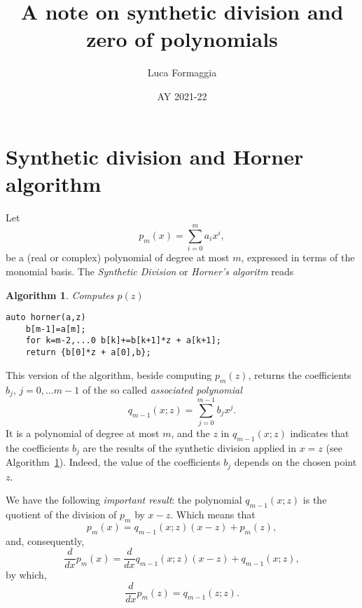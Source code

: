 \documentclass[10pt,a4paper]{article}
\author{Luca Formaggia}
\date{AY 2021-22}
\title{A note on synthetic division and zero of polynomials}
\theoremstyle{definition}%
\newtheorem{algo}{Algorithm}
\begin{document}
 
 \maketitle
 \section{Synthetic division and Horner algorithm}
 Let
 \[
 p_m(x)=\sum_{i=0}^{m} a_i x^i,
 \]
be a (real or complex) polynomial of degree at most $m$, expressed in terms of the monomial basis.
  The \emph{Synthetic Division} or \emph{Horner's algoritm} reads

\begin{algo}\label{alg:horner}
\emph{Computes $p(z)$}
\begin{lstlisting}
auto horner(a,z)
    b[m-1]=a[m];
    for k=m-2,...0 b[k]+=b[k+1]*z + a[k+1]; 
    return {b[0]*z + a[0],b}; 
\end{lstlisting}
\end{algo}
This version of the algorithm, beside computing $p_m(z)$,
  returns the coefficients $b_j$, $j=0,\ldots m-1$ of the so called \emph{associated polynomial}
\begin{equation}
\label{eq:associated}
q_{m-1}(x;z)=\sum_{j=0}^{m-1}b_j x^j.
\end{equation}
It is a polynomial of degree at most $m$, and the $z$ in $q_{m-1}(x;z)$ indicates
  that the coefficients $b_j$ are the results of the synthetic division applied in $x=z$ (see Algorithm~\ref{alg:horner}). Indeed, the value of the coefficients $b_j$ depends on the chosen point $z$.

We have the following \emph{important result}: the polynomial $q_{m-1}(x;z)$ is the quotient
  of the division of $p_m$ by $x-z$. Which means that
\begin{equation}
\label{eq:quotient}
\boxed{p_m(x)=q_{m-1}(x;z)(x-z) + p_m(z),}
\end{equation}
and, consequently,
\begin{equation}
\label{eq:quotientder}
\boxed{\frac{d}{dx}p_m(x)=\frac{d}{dx}q_{m-1}(x;z)(x-z) + q_{m-1}(x;z),}
\end{equation}
by which,
\begin{equation}
\label{eq:quotientdertwo}
\boxed{\frac{d}{dx}p_m(z)=q_{m-1}(z;z).}
\end{equation}
\end{document}

